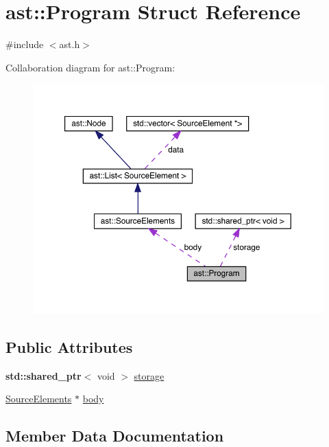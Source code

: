\hypertarget{structast_1_1_program}{}\section{ast\+:\+:Program Struct Reference}
\label{structast_1_1_program}


{\ttfamily \#include $<$ast.\+h$>$}



Collaboration diagram for ast\+:\+:Program\+:
\nopagebreak
\begin{figure}[H]
\begin{center}
\leavevmode
\includegraphics[width=350pt]{structast_1_1_program__coll__graph}
\end{center}
\end{figure}
\subsection*{Public Attributes}
\begin{DoxyCompactItemize}
\item 
\textbf{ std\+::shared\+\_\+ptr}$<$ void $>$ \hyperlink{structast_1_1_program_ad48184fda7dfd12b8f6efa5214a19a26}{storage}
\item 
\hyperlink{structast_1_1_source_elements}{Source\+Elements} $\ast$ \hyperlink{structast_1_1_program_ad81e519bcebed653b4b5d25aacb0c3ef}{body}
\end{DoxyCompactItemize}


\subsection{Member Data Documentation}
\mbox{\label{structast_1_1_program_ad81e519bcebed653b4b5d25aacb0c3ef}} 
